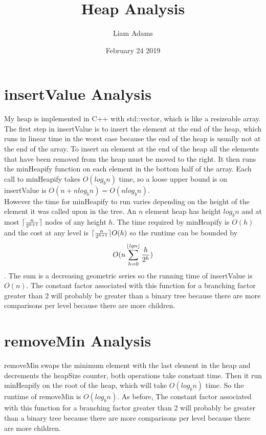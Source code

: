 \documentclass{article}
\title{Heap Analysis}
\author{Liam Adams}
\date{February 24 2019}
\DeclarePairedDelimiter{\ceil}{\lceil}{\rceil}
\DeclarePairedDelimiter{\floor}{\lfloor}{\rfloor}
\begin{document}
\maketitle

\section*{insertValue Analysis}
My heap is implemented in C++ with std::vector, which is like a resizeable array.  The first step in insertValue is to insert the element at the end of the heap, which runs in linear time in the worst case because the end of the heap is usually not at the end of the array.  To insert an element at the end of the heap all the elements that have been removed from the heap must be moved to the right.  It then runs the minHeapify function on each element in the bottom half of the array.  Each call to minHeapify takes $O(log_bn)$ time, so a loose upper bound is on insertValue is $O(n+nlog_bn)=O(nlog_bn)$.\\
However the time for minHeapify to run varies depending on the height of the element it was called upon in the tree.  An $n$ element heap has height $log_bn$ and at most $\ceil{\frac{n}{2^{h+1}}}$ nodes of any height $h$.  The time required by minHeapify is $O(h)$ and the cost at any level is $\ceil{\frac{n}{2^{h+1}}}O(h)$ so the runtime can be bounded by $$O(n\sum_{h=0}^{\floor{lgn}}\frac{h}{2^h})$$. The sum is a decreasing geometric series so the running time of insertValue is $O(n)$.  The constant factor associated with this function for a branching factor greater than 2 will probably be greater than a binary tree because there are more comparisons per level because there are more children.
\section*{removeMin Analysis}
removeMin swaps the minimum element with the last element in the heap and decrements the heapSize counter, both operations take constant time.  Then it run minHeapify on the root of the heap, which will take $O(log_bn)$ time. So the runtime of removeMin is $O(log_bn)$. As before, The constant factor associated with this function for a branching factor greater than 2 will probably be greater than a binary tree because there are more comparisons per level because there are more children.
\end{document}
